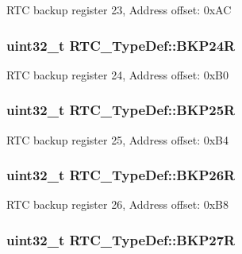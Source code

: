 R\-T\-C backup register 23, Address offset\-: 0x\-A\-C \hypertarget{struct_r_t_c___type_def_abfe68a89c3a7c2620bb0f286d3f58eea}{
\subsubsection[{B\-K\-P24\-R}]{ uint32\-\_\-t R\-T\-C\-\_\-\-Type\-Def\-::\-B\-K\-P24\-R}}\label{struct_r_t_c___type_def_abfe68a89c3a7c2620bb0f286d3f58eea}
R\-T\-C backup register 24, Address offset\-: 0x\-B0 \hypertarget{struct_r_t_c___type_def_a052e275100e4b202808fa4bbe9d5515d}{
\subsubsection[{B\-K\-P25\-R}]{ uint32\-\_\-t R\-T\-C\-\_\-\-Type\-Def\-::\-B\-K\-P25\-R}}\label{struct_r_t_c___type_def_a052e275100e4b202808fa4bbe9d5515d}
R\-T\-C backup register 25, Address offset\-: 0x\-B4 \hypertarget{struct_r_t_c___type_def_aaa12210df2df47a6276270a2b7b2d038}{
\subsubsection[{B\-K\-P26\-R}]{ uint32\-\_\-t R\-T\-C\-\_\-\-Type\-Def\-::\-B\-K\-P26\-R}}\label{struct_r_t_c___type_def_aaa12210df2df47a6276270a2b7b2d038}
R\-T\-C backup register 26, Address offset\-: 0x\-B8 \hypertarget{struct_r_t_c___type_def_a5879b0d3796b1c291f64dbaa57653624}{
\subsubsection[{B\-K\-P27\-R}]{ uint32\-\_\-t R\-T\-C\-\_\-\-Type\-Def\-::\-B\-K\-P27\-R}}\label{struct_r_t_c___type_def_a5879b0d3796b1c291f64dbaa57653624}
